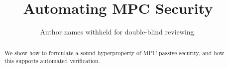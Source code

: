 \documentclass[acmsmall,screen,review]{acmart}
\begin{document}
\title{Automating MPC Security}

\author{Author names withheld for double-blind reviewing.}

\begin{abstract}
  We show how to formulate a sound hyperproperty of MPC passive security, and how this
  supports automated verification.
\end{abstract}

\maketitle









\end{document}
